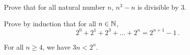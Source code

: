 \documentclass[12pt]{amsart}
\begin{document}
\begin{problem}
    Prove that
    for all natural number $n$,
    $n^3 - n$ is divisible by 3.
\end{problem}

\begin{problem}
    Prove by induction that
    for all $n \in \mathbb{N}$,
    \begin{equation*}
        2^0 + 2^1 + 2^3 + \dots+ 2^n = 2^{n+1}-1 \,.
    \end{equation*}
\end{problem}

\begin{problem}
    For all $n \geq 4$, we have $3n < 2^n$.
\end{problem}
\end{document}
